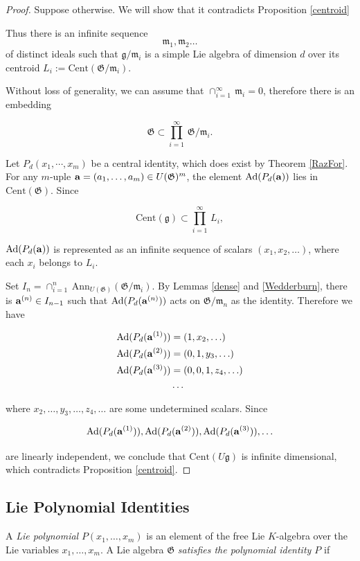 \documentclass[11pt, letterpaper, reqno]{amsart}
\theoremstyle{definition}
\newcommand{\fg}{\mathfrak{g}}
\newcommand{\fm}{\mathfrak{m}}
\newcommand{\fG}{\mathfrak{G}}
\newcommand{\Ad}{\mathrm{Ad}}
\newcommand{\Ann}{\mathrm{Ann}}
\newcommand{\Cent}{\mathrm{Cent}}
\begin{document}
\begin{proof} Suppose otherwise. We will show that it contradicts Proposition \ref{centroid}


Thus there is
an infinite sequence 
$$\fm_1,\fm_2\ldots$$ 
of distinct ideals such that 
$\fg/\fm_i$ is a simple Lie algebra of dimension $d$ over its centroid 
$L_i:=\Cent(\fG/\fm_i)$.

Without loss of generality, we can assume that
$\cap_{i=1}^\infty \,\fm_i=0$, therefore there is an embedding

$$\fG\subset \prod_{i=1}^\infty \,\fG/\fm_i.$$


Let $P_d(x_1,\cdots,x_m)$ be a central identity, which does exist by Theorem \ref{RazFor}.
For any $m$-uple 
${\bf a}=(a_1,\ldots,a_m)\in U(\fG)^m$,
the element $\Ad(P_d({\bf a}))$ lies in 
$\Cent(\fG)$. Since 

$$\Cent(\fg)\subset 
\prod_{i=1}^\infty \,L_i,$$

\noindent $\Ad(P_d({\bf a}))$ is represented as an infinite sequence of scalars
$(x_1,x_2,\ldots)$, where each $x_i$ belongs to $L_i$.

Set $I_n=\cap_{i=1}^n\,\Ann_{U(\fG)}(\fG/\fm_i)$. By Lemmas \ref{dense} and \ref{Wedderburn}, there is 
${\bf a}^{(n)}\in I_{n-1}$ such that
$\Ad(P_d({\bf a}^{(n)}))$ acts on
$\fG/\fm_n$ as the identity. Therefore we have

\begin{align*}
\Ad(P_d({\bf a}^{(1)}))&=(1,x_2, \ldots)\\
\Ad(P_d({\bf a}^{(2)}))&=(0,1,y_3,\ldots)\\
\Ad(P_d({\bf a}^{(3)}))&=(0,0,1,z_4,\ldots)\\
&\ldots
\end{align*}

\noindent where $x_2,\ldots, y_3,\ldots, z_4,\ldots$ are some undetermined scalars.
Since 

$$\Ad(P_d({\bf a}^{(1)})), \Ad(P_d({\bf a}^{(2)})), \Ad(P_d({\bf a}^{(3)})),\ldots $$

\noindent are linearly independent, we conclude that $\Cent(U\fg)$ is
infinite dimensional, which contradicts Proposition
\ref{centroid}.
\end{proof}

\subsection{Lie Polynomial Identities}

A {\it Lie polynomial} 
$P(x_1,\ldots,x_m)$ is  an element
of the free Lie $K$-algebra over the Lie
variables $x_1,\ldots,x_m$. A Lie algebra $\fG$
{\it satisfies the polynomial identity $P$}
if 
\end{document}
